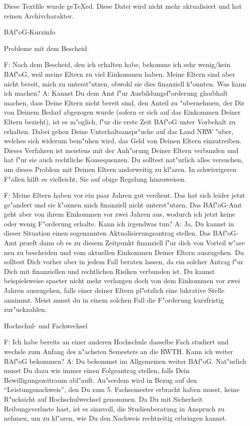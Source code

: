 \begin{artikel}{Diese Textfile wurde geTeXed. Diese Datei wird nicht mehr aktualisiert und hat reinen Archivcharakter. }

BAf"oG-Kurzinfo

Probleme mit dem Bescheid

F: Nach dem Bescheid, den ich erhalten habe, bekomme ich sehr wenig/kein BAf"oG, weil meine Eltern zu viel Einkommen haben. Meine Eltern sind aber nicht bereit, mich zu unterst"utzen, obwohl sie dies finanziell k"onnten. Was kann ich machen?
A: Kannst Du dem Amt f"ur Ausbildungsf"orderung glaubhaft machen, dass Deine Eltern nicht bereit sind, den Anteil zu "ubernehmen, der Dir von Deinem Bedarf abgezogen wurde (sofern er sich auf das Einkommen Deiner Eltern bezieht), ist es m"oglich, f"ur die erste Zeit BAf"oG unter Vorbehalt zu erhalten. Dabei gehen Deine Unterhaltsanspr"uche auf das Land NRW "uber, welches sich widerum bem"uhen wird, das Geld von Deinen Eltern einzutreiben. Dieses Verfahren ist meistens mit der Anh"orung Deiner Eltern verbunden und hat f"ur sie auch rechtliche Konsequenzen. Du solltest nat"urlich alles versuchen, um dieses Problem mit Deinen Eltern anderweitig zu kl"aren. In schwierigeren F"allen hilft es vielleicht, Sie auf obige Regelung hinzuweisen. 

F: Meine Eltern haben vor ein paar Jahren gut verdient. Das hat sich leider jetzt ge"andert und sie k"onnen mich finanziell nicht unterst"utzen. Das BAf"oG-Amt geht aber von ihrem Einkommen vor zwei Jahren aus, wodurch ich jetzt keine oder wenig F"orderung erhalte. Kann ich irgendwas tun?
A: Ja, Du kannst in dieser Situation einen sogenannten Aktualisierungsantrag stellen. Das BAf"oG-Amt prueft dann ob es zu diesem Zeitpunkt finanziell f"ur dich von Vorteil w"are neu zu bescheiden und vom aktuellen Einkommen Deiner Eltern auszugehen. Du solltest Dich vorher aber in jedem Fall beraten lassen, da ein solcher Antrag f"ur Dich mit finanziellen und rechtlichen Risiken verbunden ist. Du kannst beispielsweise spaeter nicht mehr verlangen doch von dem Einkommen vor zwei Jahren auszugehen, falls einer deiner Eltern pl"otzlich eine lukrative Stelle annimmt. Meist musst du in einem solchen Fall die F"orderung kurzfristig zur"uckzahlen.

Hochschul- und Fachwechsel

F: Ich habe bereits an einer anderen Hochschule dasselbe Fach studiert und wechsle zum Anfang des n"achsten Semesters an die RWTH. Kann ich weiter BAf"oG bekommen?
A: Du bekommst im Allgemeinen weiter BAf"oG. Nat"urlich musst Du dazu wie immer einen Folgeantrag stellen, falls Dein Bewilligungszeitraum abl"auft. Au"serdem wird in Bezug auf den "`Leistungsnachweis"', den Du zum 5. Fachsemester erbracht haben musst, keine R"ucksicht auf Hochschulwechsel genommen. Da Du mit Sicherheit Reibungsverluste hast, ist es sinnvoll, die Studienberatung in Anspruch zu nehmen, um zu kl"aren, wie Du den Nachweis rechtzeitig erbringen kannst. 


\end{artikel}
